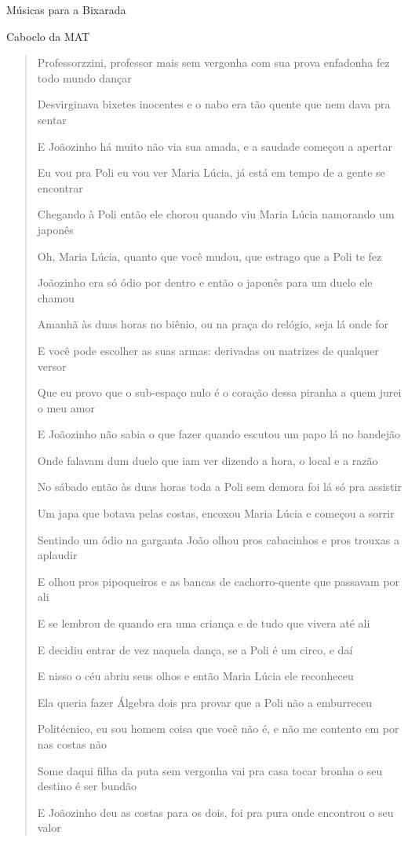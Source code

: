 \begin{secao}{Músicas para a Bixarada}
\begin{subsecao}{Caboclo da MAT}
\begin{verse}
Professorzzini, professor mais sem vergonha com sua prova enfadonha fez todo mundo
dançar

Desvirginava bixetes inocentes e o nabo era tão quente que nem dava pra sentar

E Joãozinho há muito não via sua amada, e a saudade começou a apertar

Eu vou pra Poli eu vou ver Maria Lúcia, já está em tempo de a gente se
encontrar

Chegando à Poli então ele chorou quando viu Maria Lúcia namorando um japonês

Oh, Maria Lúcia, quanto que você mudou, que estrago que a Poli te fez

Joãozinho era só ódio por dentro e então o japonês para um duelo ele chamou

Amanhã às duas horas no biênio, ou na praça do relógio, seja lá onde for

E você pode escolher as suas armas: derivadas ou matrizes de qualquer versor

Que eu provo que o sub-espaço nulo é o coração dessa piranha a quem jurei o meu
amor

E Joãozinho não sabia o que fazer quando escutou um papo lá no bandejão

Onde falavam dum duelo que iam ver dizendo a hora, o local e a razão

No sábado então às duas horas toda a Poli sem demora foi lá só pra assistir

Um japa que botava pelas costas, encoxou Maria Lúcia e começou a sorrir

Sentindo um ódio na garganta João olhou pros cabacinhos e pros trouxas a
aplaudir

E olhou pros pipoqueiros e as bancas de cachorro-quente que passavam por ali

E se lembrou de quando era uma criança e de tudo que vivera até ali

E decidiu entrar de vez naquela dança, se a Poli é um circo, e daí

E nisso o céu abriu seus olhos e então Maria Lúcia ele reconheceu

Ela queria fazer Álgebra dois pra provar que a Poli não a emburreceu

Politécnico, eu sou homem coisa que você não é, e não me contento em por nas
costas não

Some daqui filha da puta sem vergonha vai pra casa tocar bronha o seu destino é
ser bundão

E Joãozinho deu as costas para os dois, foi pra pura onde encontrou o seu valor


\end{verse}
\end{subsecao}
\end{secao}
